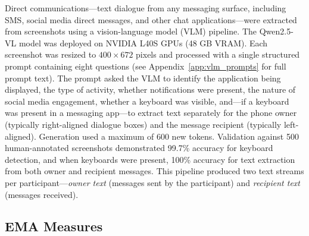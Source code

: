 \documentclass[review,12pt,authoryear]{elsarticle}
\begin{document}
Direct communications---text dialogue from any messaging surface, including SMS, social media direct messages, and other chat applications---were extracted from screenshots using a vision-language model (VLM) pipeline. The Qwen2.5-VL model \citep{qwen2025qwen3} was deployed on NVIDIA L40S GPUs (48 GB VRAM). Each screenshot was resized to $400 \times 672$ pixels and processed with a single structured prompt containing eight questions (see Appendix~\ref{app:vlm_prompts} for full prompt text). The prompt asked the VLM to identify the application being displayed, the type of activity, whether notifications were present, the nature of social media engagement, whether a keyboard was visible, and---if a keyboard was present in a messaging app---to extract text separately for the phone owner (typically right-aligned dialogue boxes) and the message recipient (typically left-aligned). Generation used a maximum of 600 new tokens. Validation against 500 human-annotated screenshots demonstrated 99.7\% accuracy for keyboard detection, and when keyboards were present, 100\% accuracy for text extraction from both owner and recipient messages. This pipeline produced two text streams per participant---\textit{owner text} (messages sent by the participant) and \textit{recipient text} (messages received).

\subsection{EMA Measures}
\end{document}
